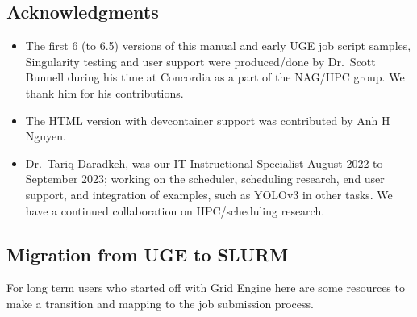 \subsection{Acknowledgments}
\label{sect:acks}

\begin{itemize}
	\item 
The first 6 (to 6.5) versions of this manual and early UGE job script samples,
Singularity testing and user support were produced/done by Dr.~Scott Bunnell
during his time at Concordia as a part of the NAG/HPC group. We thank
him for his contributions.
	\item 
The HTML version with devcontainer support was contributed by Anh H Nguyen.
	\item 
Dr.~Tariq Daradkeh, was our IT Instructional Specialist August 2022 to September 2023;
working on the scheduler, scheduling research, end user support, and integration of
examples, such as YOLOv3 in  other tasks. We have a continued
collaboration on HPC/scheduling research.
\end{itemize}

\subsection{Migration from UGE to SLURM}
\label{appdx:uge-to-slurm}

For long term users who started off with Grid Engine here are some resources
to make a transition and mapping to the job submission process.

